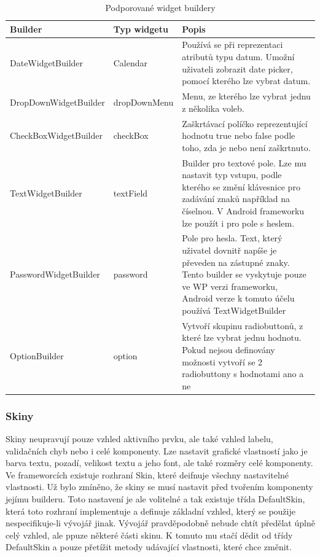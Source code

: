 \begin{table}[h!]
\begin{center}
\caption{Podporované widget buildery}
\label{table:widgetBuilders}
\begin{tabular}{|p{4cm}|p{3cm}|p{7cm}|}
\hline
\textbf{Builder} & \textbf{Typ widgetu} & \textbf{Popis} \\
\hline
DateWidgetBuilder & 
Calendar & Používá se při reprezentaci atributů typu datum. Umožní uživateli zobrazit date picker, pomocí kterého lze vybrat datum. \\
\hline
DropDownWidgetBuilder &
dropDownMenu & Menu, ze kterého lze vybrat jednu z několika voleb. \\
\hline
CheckBoxWidgetBuilder & checkBox &
Zaškrtávací políčko reprezentující hodnotu true nebo false podle toho, zda je nebo není zaškrtnuto. \\
\hline
TextWidgetBuilder & textField &
Builder pro textové pole. Lze mu nastavit typ vstupu, podle kterého se změní klávesnice pro zadávání znaků například na číselnou. V Android frameworku lze použít i pro pole s heslem. \\
\hline
PasswordWidgetBuilder & password &
Pole pro hesla. Text, který uživatel dovnitř napíše je převeden na zástupné znaky. Tento builder se vyskytuje pouze ve WP verzi frameworku, Android verze k tomuto účelu používá TextWidgetBuilder \\
\hline
OptionBuilder & option &
Vytvoří skupinu radiobuttonů, z které lze vybrat jednu hodnotu. Pokud nejsou definovány možnosti vytvoří se 2 radiobuttony s hodnotami ano a ne \\
\hline
\end{tabular}
\end{center}
\end{table}

\subsubsection{Skiny}
Skiny neupravují pouze vzhled aktivního prvku, ale také vzhled labelu, validačních chyb nebo i celé komponenty. Lze nastavit grafické vlastností jako je barva textu, pozadí, velikost textu a jeho font, ale také rozměry celé komponenty. Ve frameworcích existuje rozhraní Skin, které deifnuje všechny nastavitelné vlastnosti. Už bylo zmíněno, že skiny se musí nastavit před tvořením komponenty jejímu builderu. Toto nastavení je ale volitelné a tak existuje třída DefaultSkin, která toto rozhraní implementuje a definuje základní vzhled, který se použije nespecifikuje-li vývojář jinak. Vývojář pravděpodobně nebude chtít předělat úplně celý vzhled, ale ppuze některé části skinu. K tomuto mu stačí dědit od třídy DefaultSkin a pouze přetížit metody udávající vlastnosti, které chce změnit.

